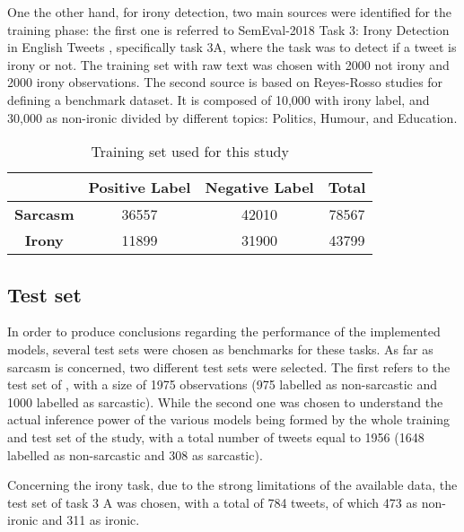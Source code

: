 One the other hand, for irony detection, two main sources were identified for the training phase: the first one is referred to SemEval-2018 Task 3: Irony Detection in English Tweets \cite{semeval}, specifically task 3A, where the task was to detect if a tweet is irony or not. The training set with raw text was chosen with 2000 not irony and 2000 irony observations. The second source is based on Reyes-Rosso studies \cite{reyes} for defining a benchmark dataset. It is composed of 10,000 with irony label, and 30,000 as non-ironic divided by different topics: Politics, Humour, and Education.

\begin{table}[H]
	\centering
	\begin{tabular}{|c|c|c|c|}
		\hline
		& \textbf{Positive Label} & \textbf{Negative Label} & \textbf{Total} \\ \hline
		\textbf{Sarcasm} & 36557                   & 42010                   & 78567          \\ \hline
		\textbf{Irony}   & 11899                   & 31900                   & 43799          \\ \hline
	\end{tabular}
	\caption{Training set used for this study}
	\label{tab: trainingset}
\end{table}

\subsection{Test set}
In order to produce conclusions regarding the performance of the implemented models, several test sets were chosen as benchmarks for these tasks. As far as sarcasm is concerned, two different test sets were selected. The first refers to the test set of \cite{ghosh}, with a size of 1975 observations (975 labelled as non-sarcastic and 1000 labelled as sarcastic). While the second one was chosen to understand the actual inference power of the various models being formed by the whole training and test set of the \cite{riloff} study, with a total number of tweets equal to 1956 (1648 labelled as non-sarcastic and 308 as sarcastic).

Concerning the irony task, due to the strong limitations of the available data, the test set of \cite{semeval} task 3 A was chosen, with a total of 784 tweets, of which 473 as non-ironic and 311 as ironic. 

